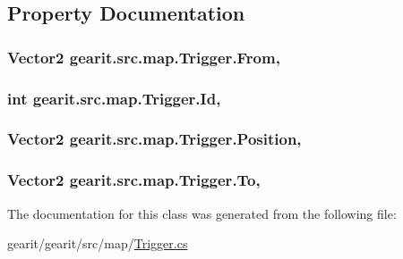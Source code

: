 \subsection{Property Documentation}
\hypertarget{classgearit_1_1src_1_1map_1_1_trigger_a898cd64b9b1f8a61297f7d64f3d16d41}{
\subsubsection[{From}]{\setlength{\rightskip}{0pt plus 5cm}Vector2 gearit.\+src.\+map.\+Trigger.\+From\hspace{0.3cm}{\ttfamily [get]}, {\ttfamily [set]}}}\label{classgearit_1_1src_1_1map_1_1_trigger_a898cd64b9b1f8a61297f7d64f3d16d41}
\hypertarget{classgearit_1_1src_1_1map_1_1_trigger_a31311392633427b030fa12e00de0593e}{
\subsubsection[{Id}]{\setlength{\rightskip}{0pt plus 5cm}int gearit.\+src.\+map.\+Trigger.\+Id\hspace{0.3cm}{\ttfamily [get]}, {\ttfamily [set]}}}\label{classgearit_1_1src_1_1map_1_1_trigger_a31311392633427b030fa12e00de0593e}
\hypertarget{classgearit_1_1src_1_1map_1_1_trigger_af8fb981eb74c809530dedcd3cf0d23c1}{
\subsubsection[{Position}]{\setlength{\rightskip}{0pt plus 5cm}Vector2 gearit.\+src.\+map.\+Trigger.\+Position\hspace{0.3cm}{\ttfamily [get]}, {\ttfamily [set]}}}\label{classgearit_1_1src_1_1map_1_1_trigger_af8fb981eb74c809530dedcd3cf0d23c1}
\hypertarget{classgearit_1_1src_1_1map_1_1_trigger_a2add605485213c4842fda9b9994a5a63}{
\subsubsection[{To}]{\setlength{\rightskip}{0pt plus 5cm}Vector2 gearit.\+src.\+map.\+Trigger.\+To\hspace{0.3cm}{\ttfamily [get]}, {\ttfamily [set]}}}\label{classgearit_1_1src_1_1map_1_1_trigger_a2add605485213c4842fda9b9994a5a63}


The documentation for this class was generated from the following file\+:\begin{DoxyCompactItemize}
\item 
gearit/gearit/src/map/\hyperlink{_trigger_8cs}{Trigger.\+cs}\end{DoxyCompactItemize}
